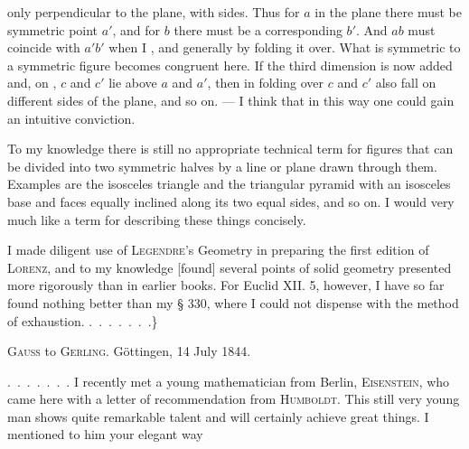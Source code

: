%
\noindent only  perpendicular to the plane, with  sides. Thus for $a$ in the plane there must be  symmetric point $a'$, and for $b$ there must be a corresponding $b'$. And $ab$ must coincide with $a'b'$ when I , and generally  by folding it over. What is symmetric to a symmetric figure becomes congruent here. If the third dimension is now added and, on , $c$ and $c'$ lie above $a$ and $a'$, then in folding over $c$ and $c'$ also fall on different sides of the plane, and so on. --- I think that in this way one could gain an intuitive conviction.

\begin{center}\end{center}

To my knowledge there is still no appropriate technical term for figures that can be divided into two symmetric halves by a line or plane drawn through them. Examples are the isosceles triangle and the triangular pyramid with an isosceles base and faces equally inclined along its two equal sides, and so on. I would very much like a term for describing these things concisely.

I made diligent use of \textsc{Legendre}'s Geometry in preparing the first edition of \textsc{Lorenz}, and to my knowledge [found] several points of solid geometry presented more rigorously than in earlier books. For Euclid XII. 5, however, I have so far found nothing better than my § 330, where I could not dispense with the method of exhaustion. \mbox{.\ .\ .\ .\ .\ .\ .}\}

\begin{center}
\textsc{Gauss} to \textsc{Gerling.} Göttingen, 14 July 1844.
\end{center}

\mbox{.\ .\ .\ .\ .\ .\ .} I recently met a young mathematician from Berlin, \textsc{Eisenstein}, who came here with a letter of recommendation from \textsc{Humboldt}. This still very young man shows quite remarkable talent and will certainly achieve great things. I mentioned to him your elegant way\space%
